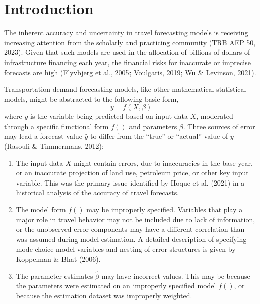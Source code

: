 \documentclass[fancy, masters, twoside]{byuthesis}
\begin{document}
	\tableofcontents
	\cleardoublepage

	\listoffigures
	\cleardoublepage

	\listoftables
	\cleardoublepage

	
	\cleardoublepage

	\mainmatter

\hypertarget{introduction}{%
\chapter{Introduction}\label{introduction}}

The inherent accuracy and uncertainty in travel forecasting models is receiving increasing attention from the scholarly and practicing community (TRB AEP 50, 2023). Given that such models are used in the allocation of billions of dollars of infrastructure financing each year, the financial risks for inaccurate or imprecise forecasts are high (Flyvbjerg et al., 2005; Voulgaris, 2019; Wu \& Levinson, 2021).

Transportation demand forecasting models, like other mathematical-statistical models, might be abstracted to the following basic form,
\begin{equation}
y = f(X, \beta)
\end{equation}
where \(y\) is the variable being predicted based on input data \(X\), moderated through a specific functional form \(f()\) and parameters \(\beta\). Three sources of error may lead a forecast value \(\hat{y}\) to differ from the ``true'' or ``actual'' value of \(y\) (Rasouli \& Timmermans, 2012):

\begin{enumerate}
\def\labelenumi{\arabic{enumi}.}
\item
  The input data \(X\) might contain errors, due to inaccuracies in the base year, or an inaccurate projection of land use, petroleum price, or other key input variable. This was the primary issue identified by Hoque et al. (2021) in a historical analysis of the accuracy of travel forecasts.
\item
  The model form \(f()\) may be improperly specified. Variables that play a major role in travel behavior may not be included due to lack of information, or the unobserved error components may have a different correlation than was assumed during model estimation. A detailed description of specifying mode choice model variables and nesting of error structures is given by Koppelman \& Bhat (2006).
\item
  The parameter estimates \(\hat{\beta}\) may have incorrect values. This may be because the parameters were estimated on an improperly specified model \(f()\), or because the estimation dataset was improperly weighted.
\end{enumerate}
\end{document}
